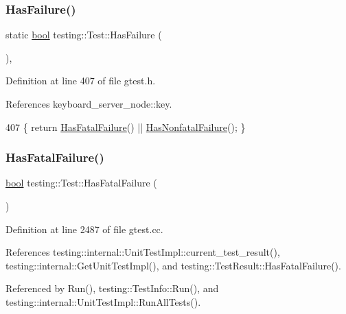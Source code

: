 \subsubsection{\texorpdfstring{Has\+Failure()}{HasFailure()}}
{\footnotesize\ttfamily static \hyperlink{classbool}{bool} testing\+::\+Test\+::\+Has\+Failure (\begin{DoxyParamCaption}{ }\end{DoxyParamCaption})\hspace{0.3cm}{\ttfamily [inline]}, {\ttfamily [static]}}



Definition at line 407 of file gtest.\+h.



References keyboard\+\_\+server\+\_\+node\+::key.


\begin{DoxyCode}
407 \{ \textcolor{keywordflow}{return} \hyperlink{classtesting_1_1Test_aa8d0725cfb519f82eaf4fd2d2f46d97d}{HasFatalFailure}() || \hyperlink{classtesting_1_1Test_a3b933cea62eff67a05e23aa07f38bf29}{HasNonfatalFailure}(); \}
\end{DoxyCode}
\mbox{\label{classtesting_1_1Test_aa8d0725cfb519f82eaf4fd2d2f46d97d}} 
\subsubsection{\texorpdfstring{Has\+Fatal\+Failure()}{HasFatalFailure()}}
{\footnotesize\ttfamily \hyperlink{classbool}{bool} testing\+::\+Test\+::\+Has\+Fatal\+Failure (\begin{DoxyParamCaption}{ }\end{DoxyParamCaption})\hspace{0.3cm}{\ttfamily [static]}}



Definition at line 2487 of file gtest.\+cc.



References testing\+::internal\+::\+Unit\+Test\+Impl\+::current\+\_\+test\+\_\+result(), testing\+::internal\+::\+Get\+Unit\+Test\+Impl(), and testing\+::\+Test\+Result\+::\+Has\+Fatal\+Failure().



Referenced by Run(), testing\+::\+Test\+Info\+::\+Run(), and testing\+::internal\+::\+Unit\+Test\+Impl\+::\+Run\+All\+Tests().


